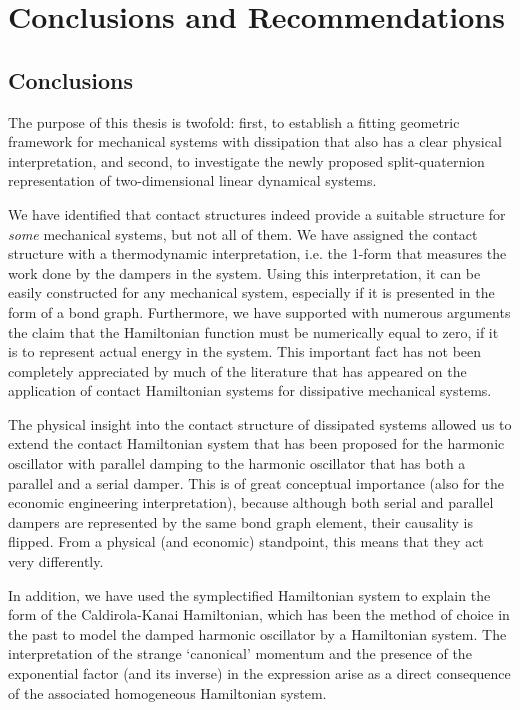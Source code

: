 \chapter{Conclusions and Recommendations}
\label{chap:conclusion}

\section*{Conclusions}
The purpose of this thesis is twofold: first, to establish a fitting geometric framework for mechanical systems with dissipation that also has a clear physical interpretation, and second, to investigate the newly proposed split-quaternion representation of two-dimensional linear dynamical systems. 

We have identified that contact structures indeed provide a suitable structure for \emph{some} mechanical systems, but not all of them. We have assigned the contact structure with a thermodynamic interpretation, i.e. the 1-form that measures the work done by the dampers in the system. Using this interpretation, it can be easily constructed for any mechanical system, especially if it is presented in the form of a bond graph. Furthermore, we have supported with numerous arguments the claim that the Hamiltonian function must be numerically equal to zero, if it is to represent actual energy in the system. This important fact has not been completely appreciated by much of the literature that has appeared on the application of contact Hamiltonian systems for dissipative mechanical systems.

The physical insight into the contact structure of dissipated systems allowed us to extend the contact Hamiltonian system that has been proposed for the harmonic oscillator with parallel damping to the harmonic oscillator that has both a parallel and a serial damper. This is of great conceptual importance (also for the economic engineering interpretation), because although both serial and parallel dampers are represented by the same bond graph element, their causality is flipped. From a physical (and economic) standpoint, this means that they act very differently.

In addition, we have used the symplectified Hamiltonian system to explain the form of the Caldirola-Kanai Hamiltonian, which has been the method of choice in the past to model the damped harmonic oscillator by a Hamiltonian system. The interpretation of the strange `canonical' momentum and the presence of the exponential factor (and its inverse) in the expression arise as a direct consequence of the associated homogeneous Hamiltonian system.

